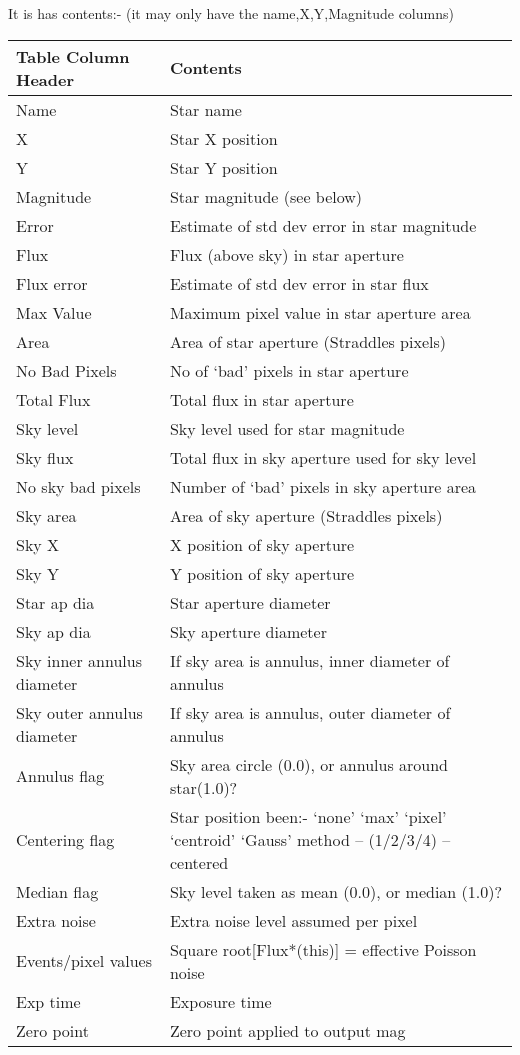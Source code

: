 \begin{small}
{{  It is has contents:-  (it may only have the name,X,Y,Magnitude
  columns)
                               
\begin{tabular}{|l|p{3in}|}\hline
   Table Column Header & Contents \\ \hline
   Name               &	Star name \\
   X 			& Star X position \\
   Y			& Star Y position \\
   Magnitude		& Star magnitude (see below) \\
   Error		& Estimate of std dev error in star magnitude \\
   Flux			& Flux (above sky) in star aperture \\
   Flux error		& Estimate of std dev error in star flux \\
   Max Value 		& Maximum pixel value in star aperture area \\
   Area 		& Area of star aperture (Straddles pixels) \\
   No Bad Pixels 	& No of `bad' pixels in star aperture \\
   Total Flux		& Total flux in star aperture \\
   Sky level 		& Sky level used for star magnitude \\
   Sky flux 		& Total flux in sky aperture used for sky level \\
   No sky bad pixels	& Number of `bad' pixels in sky aperture area \\
   Sky area 		& Area of sky aperture (Straddles pixels) \\
   Sky X 		& X position of sky aperture \\
   Sky Y  		& Y position of sky aperture \\
   Star ap dia 		& Star aperture diameter \\
   Sky ap dia 		& Sky aperture diameter \\
   Sky inner annulus diameter   & If sky area is annulus, inner diameter 
                                  of annulus \\
   Sky outer annulus diameter  &  If sky area is annulus, outer diameter 
                                  of annulus \\
   Annulus flag 	& Sky area circle (0.0), or annulus around 
                          star(1.0)? \\
   Centering flag 	& Star position been:- `none' `max' `pixel' 
                          `centroid' `Gauss' method -- (1/2/3/4) -- 
                           centered \\
   Median flag 		& Sky level taken as mean (0.0), or median (1.0)? \\
   Extra noise 		& Extra noise level assumed per pixel \\
   Events/pixel values 	& Square root[Flux*(this)] = effective Poisson 
                          noise \\
   Exp time 		& Exposure time \\
   Zero point		& Zero point applied to output mag \\ \hline
\end{tabular}
                          
}}
\end{small}
